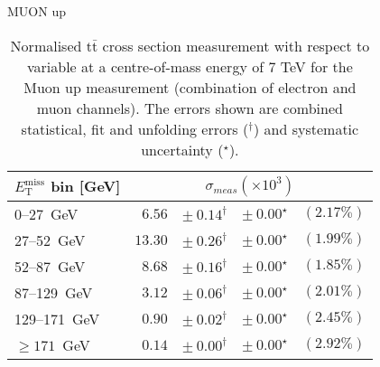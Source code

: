 \documentclass{article}
\newcommand{\ttbar}{\ensuremath{\text{t}\bar{\text{t}}}\xspace}
\newcommand{\GeV}{GeV}
\begin{document}
MUON up
\begin{table}[htbp]
\setlength{\tabcolsep}{2pt}
\centering
\caption{Normalised \ttbar cross section measurement with respect to \MET variable
at a centre-of-mass energy of 7 TeV for the Muon up measurement (combination of electron and muon
channels). The errors shown are combined statistical, fit and unfolding errors ($^\dagger$) and systematic uncertainty ($^\star$).}
\label{tab:MET_xsections_7TeV_Muon_up_combined}
\begin{tabular}{lrrrr}
\hline
$E_{\mathrm{T}}^{\mathrm{miss}}$ bin [\GeV] & \multicolumn{4}{c}{$\sigma_{meas} \left(\times 10^{3}\right)$}\\ 
\hline
0--27~\GeV &  $6.56$ & $ \pm~ 0.14^\dagger$ & $ \pm~ 0.00^\star$ & $(2.17\%)$\\ 
27--52~\GeV &  $13.30$ & $ \pm~ 0.26^\dagger$ & $ \pm~ 0.00^\star$ & $(1.99\%)$\\ 
52--87~\GeV &  $8.68$ & $ \pm~ 0.16^\dagger$ & $ \pm~ 0.00^\star$ & $(1.85\%)$\\ 
87--129~\GeV &  $3.12$ & $ \pm~ 0.06^\dagger$ & $ \pm~ 0.00^\star$ & $(2.01\%)$\\ 
129--171~\GeV &  $0.90$ & $ \pm~ 0.02^\dagger$ & $ \pm~ 0.00^\star$ & $(2.45\%)$\\ 
$\geq 171$~\GeV &  $0.14$ & $ \pm~ 0.00^\dagger$ & $ \pm~ 0.00^\star$ & $(2.92\%)$\\ 
\hline 
\end{tabular}
\end{table}
\end{document}
